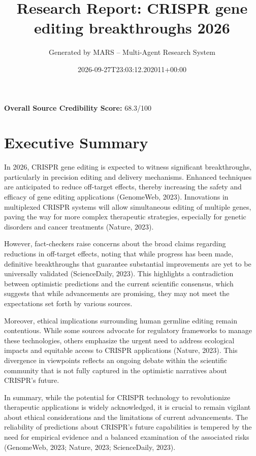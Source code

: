 \documentclass[11pt,a4paper]{article}
\title{\textbf{Research Report:} CRISPR gene editing breakthroughs 2026}
\author{Generated by MARS -- Multi-Agent Research System}
\date{2026-09-27T23:03:12.202011+00:00}
\begin{document}
\maketitle

\begin{center}
\textbf{Overall Source Credibility Score:} 68.3/100
\end{center}

\section{Executive Summary}

In 2026, CRISPR gene editing is expected to witness significant breakthroughs, particularly in precision editing and delivery mechanisms. Enhanced techniques are anticipated to reduce off-target effects, thereby increasing the safety and efficacy of gene editing applications (GenomeWeb, 2023). Innovations in multiplexed CRISPR systems will allow simultaneous editing of multiple genes, paving the way for more complex therapeutic strategies, especially for genetic disorders and cancer treatments (Nature, 2023).

However, fact-checkers raise concerns about the broad claims regarding reductions in off-target effects, noting that while progress has been made, definitive breakthroughs that guarantee substantial improvements are yet to be universally validated (ScienceDaily, 2023). This highlights a contradiction between optimistic predictions and the current scientific consensus, which suggests that while advancements are promising, they may not meet the expectations set forth by various sources.

Moreover, ethical implications surrounding human germline editing remain contentious. While some sources advocate for regulatory frameworks to manage these technologies, others emphasize the urgent need to address ecological impacts and equitable access to CRISPR applications (Nature, 2023). This divergence in viewpoints reflects an ongoing debate within the scientific community that is not fully captured in the optimistic narratives about CRISPR's future.

In summary, while the potential for CRISPR technology to revolutionize therapeutic applications is widely acknowledged, it is crucial to remain vigilant about ethical considerations and the limitations of current advancements. The reliability of predictions about CRISPR's future capabilities is tempered by the need for empirical evidence and a balanced examination of the associated risks (GenomeWeb, 2023; Nature, 2023; ScienceDaily, 2023).
\end{document}
